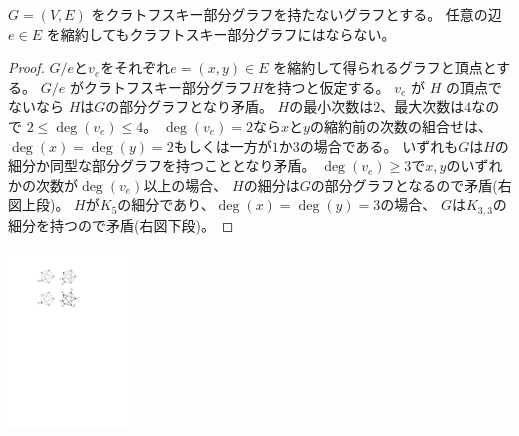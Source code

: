 \begin{lemma}\label{lemma:contractions_dont_make_kuratowski_subgraph}
$G = (V, E)$ をクラトフスキー部分グラフを持たないグラフとする。
任意の辺 $e \in E$ を縮約してもクラフトスキー部分グラフにはならない。
\end{lemma}

\vspace*{-\intextsep}
\begin{paracol}{2}
\begin{proof}
$G / e$と$v_e$をそれぞれ$e=(x, y) \in E$ を縮約して得られるグラフと頂点とする。
$G/e$ がクラトフスキー部分グラフ$H$を持つと仮定する。
$v_e$ が $H$ の頂点でないなら $H$は$G$の部分グラフとなり矛盾。
$H$の最小次数は$2$、最大次数は$4$なので $2 \leq \deg(v_e) \leq 4$。
$\deg(v_e) = 2$なら$x$と$y$の縮約前の次数の組合せは、
$\deg(x) = \deg(y) = 2$もしくは一方が$1$か$3$の場合である。
いずれも$G$は$H$の細分か同型な部分グラフを持つこととなり矛盾。
$\deg(v_e)\geq 3$で$x, y$のいずれかの次数が$\deg({v_e})$以上の場合、
$H$の細分は$G$の部分グラフとなるので矛盾(右図上段)。
$H$が$K_5$の細分であり、$\deg(x) = \deg(y) = 3$の場合、
$G$は$K_{3,3}$の細分を持つので矛盾(右図下段)。
\end{proof}


\switchcolumn
\vspace{0.5\intextsep}
\centering
\includegraphics[width=0.25\textwidth]{figures/contraction_01.pdf}
\end{paracol}




